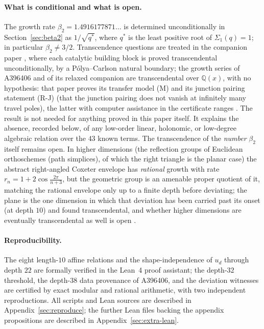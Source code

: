 \documentclass[11pt]{article}
\theoremstyle{plain}
\theoremstyle{definition}
\theoremstyle{remark}
\newcommand{\Q}{\mathbb{Q}}
\begin{document}
\paragraph{What is conditional and what is open.}
The growth rate $\beta_2=1.4916177871\ldots$ is determined unconditionally in Section~\ref{sec:beta2} as $1/\sqrt{q^\ast}$, where $q^\ast$ is the least positive root of $\Sigma_1(q)=1$; in particular $\beta_2\neq 3/2$. Transcendence questions are treated in the companion paper \cite{Bonfioli2026b}, where each
catalytic building block is proved transcendental unconditionally, by a P\'olya--Carlson natural
boundary; the growth series of A396406 and of its relaxed companion are transcendental over
$\Q(x)$, with no hypothesis: that paper proves its transfer model \textup{(M)} and its junction
pairing statement \textup{(R-J)} (that the junction pairing does not vanish at infinitely many
travel poles), the latter with computer assistance in the certificate ranges
\cite{Bonfioli2026b}. The result is not needed for anything proved in this paper itself. It
explains the absence, recorded below, of any low-order linear, holonomic, or
low-degree algebraic relation over the $43$ known terms. The transcendence of the \emph{number}
$\beta_2$ itself remains open. In higher dimensions (the reflection groups of Euclidean
orthoschemes (path simplices), of which the right triangle is the planar case) the abstract
right-angled Coxeter envelope has \emph{rational} growth with rate $r_n=1+2\cos\frac{2\pi}{n+3}$, but
the geometric group is an amenable proper quotient of it, matching the rational envelope only up to a
finite depth before deviating; the plane is the one dimension in which that deviation has been carried
past its onset (at depth $10$) and found transcendental, and whether higher dimensions are eventually
transcendental as well is open \cite{Bonfioli2026c}.

\paragraph{Reproducibility.}
The eight length-$10$ affine relations and the shape-independence of
$u_d$ through depth $22$ are formally verified in the Lean~4 proof
assistant; the depth-$32$ threshold, the depth-$38$ data provenance of
A396406, and the deviation witnesses are certified by exact modular and
rational arithmetic, with two independent reproductions. All scripts and
Lean sources are described in Appendix~\ref{sec:reproduce}; the further
Lean files backing the appendix propositions are described in
Appendix~\ref{sec:extra-lean}.
\end{document}
